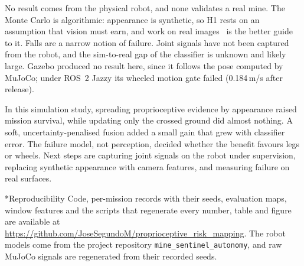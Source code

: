 \documentclass[conference,a4paper]{IEEEtran}
\makeatletter
\def\section{\@startsection{section}{1}{\z@}{1.5ex}{0.7ex}{\normalfont\normalsize\centering\scshape}}
\makeatother
\begin{document}
No result comes from the physical robot, and none validates a real mine. The Monte Carlo is algorithmic: appearance is synthetic, so H1 rests on an assumption that vision must earn, and work on real images~\cite{wellhausen2019,mattamala2025} is the better guide to it. Falls are a narrow notion of failure. Joint signals have not been captured from the robot, and the sim-to-real gap of the classifier is unknown and likely large. Gazebo produced no result here, since it follows the pose computed by MuJoCo; under ROS~2 Jazzy its wheeled motion gate failed (0.184\,m/s after release).

\FloatBarrier
\section{Conclusion}
In this simulation study, spreading proprioceptive evidence by appearance raised mission survival, while updating only the crossed ground did almost nothing. A soft, uncertainty-penalised fusion added a small gain that grew with classifier error. The failure model, not perception, decided whether the benefit favours legs or wheels. Next steps are capturing joint signals on the robot under supervision, replacing synthetic appearance with camera features, and measuring failure on real surfaces.

\section*{Reproducibility}
Code, per-mission records with their seeds, evaluation maps, window features and the scripts that regenerate every number, table and figure are available at \url{https://github.com/JoseSegundoM/proprioceptive_risk_mapping}. The robot models come from the project repository \texttt{mine\_sentinel\_autonomy}, and raw MuJoCo signals are regenerated from their recorded seeds.



\end{document}
